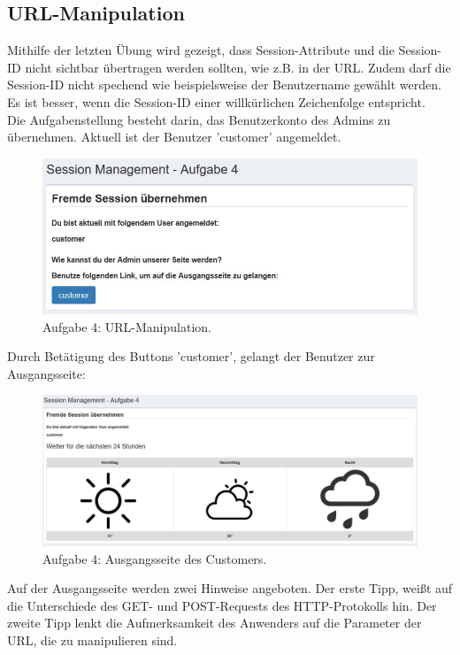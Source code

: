\subsection{URL-Manipulation}
Mithilfe der letzten Übung wird gezeigt, dass Session-Attribute und die Session-ID nicht sichtbar übertragen werden sollten, wie z.B. in der URL. Zudem darf die Session-ID nicht spechend wie beispielsweise der Benutzername gewählt werden. Es ist besser, wenn die Session-ID einer willkürlichen Zeichenfolge entspricht.\\
Die Aufgabenstellung besteht darin, das Benutzerkonto des Admins zu übernehmen. Aktuell ist der Benutzer 'customer' angemeldet.\\
\begin{figure}[H]
	\includegraphics[width=1.0\linewidth]{images/BrokenAuthenticationAndSessionManagement/URL_Start}
	\caption[Aufgabe 4: URL-Manipulation.]{Aufgabe 4: URL-Manipulation.}
	\label{fig:Aufgabe 4 URL-Manipulation}
\end{figure}
\noindent Durch Betätigung des Buttons 'customer', gelangt der Benutzer zur Ausgangsseite:
\begin{figure}[H]
	\includegraphics[width=0.95\linewidth]{images/BrokenAuthenticationAndSessionManagement/URL_customer}
	\caption[Aufgabe 4: Ausgangsseite des Customers.]{Aufgabe 4: Ausgangsseite des Customers.}
	\label{fig:Aufgabe 4 Ausgangsseite des Customers}
\end{figure}
\noindent Auf der Ausgangsseite werden zwei Hinweise angeboten. Der erste Tipp, weißt auf die Unterschiede des GET- und POST-Requests des HTTP-Protokolls hin. Der zweite Tipp lenkt die Aufmerksamkeit des Anwenders auf die Parameter der URL, die zu manipulieren sind.\\
